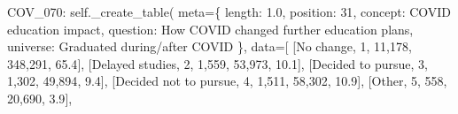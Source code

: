 \documentclass[
  11pt,
  a4paper,
]{article}
\newenvironment{Shaded}{\begin{snugshade}}{\end{snugshade}}
\newcommand{\NormalTok}[1]{\textcolor[rgb]{0.00,0.23,0.31}{#1}}
\newcommand{\OperatorTok}[1]{\textcolor[rgb]{0.37,0.37,0.37}{#1}}
\newcommand{\StringTok}[1]{\textcolor[rgb]{0.13,0.47,0.30}{#1}}
\newcommand{\VariableTok}[1]{\textcolor[rgb]{0.07,0.07,0.07}{#1}}
\begin{document}
\begin{Shaded}
\begin{Highlighting}[]
            \StringTok{\textquotesingle{}COV\_070\textquotesingle{}}\NormalTok{: }\VariableTok{self}\NormalTok{.\_create\_table(}
\NormalTok{                meta}\OperatorTok{=}\NormalTok{\{}
                \StringTok{\textquotesingle{}length\textquotesingle{}}\NormalTok{: }\StringTok{\textquotesingle{}1.0\textquotesingle{}}\NormalTok{, }\StringTok{\textquotesingle{}position\textquotesingle{}}\NormalTok{: }\StringTok{\textquotesingle{}31\textquotesingle{}}\NormalTok{,}
                \StringTok{\textquotesingle{}concept\textquotesingle{}}\NormalTok{: }\StringTok{\textquotesingle{}COVID education impact\textquotesingle{}}\NormalTok{,}
                \StringTok{\textquotesingle{}question\textquotesingle{}}\NormalTok{: }\StringTok{\textquotesingle{}How COVID changed further education plans\textquotesingle{}}\NormalTok{,}
                \StringTok{\textquotesingle{}universe\textquotesingle{}}\NormalTok{: }\StringTok{\textquotesingle{}Graduated during/after COVID\textquotesingle{}}
\NormalTok{                \},}
\NormalTok{                data}\OperatorTok{=}\NormalTok{[}
\NormalTok{                [}\StringTok{\textquotesingle{}No change\textquotesingle{}}\NormalTok{, }\StringTok{\textquotesingle{}1\textquotesingle{}}\NormalTok{, }\StringTok{\textquotesingle{}11,178\textquotesingle{}}\NormalTok{, }\StringTok{\textquotesingle{}348,291\textquotesingle{}}\NormalTok{, }\StringTok{\textquotesingle{}65.4\textquotesingle{}}\NormalTok{],}
\NormalTok{                [}\StringTok{\textquotesingle{}Delayed studies\textquotesingle{}}\NormalTok{, }\StringTok{\textquotesingle{}2\textquotesingle{}}\NormalTok{, }\StringTok{\textquotesingle{}1,559\textquotesingle{}}\NormalTok{, }\StringTok{\textquotesingle{}53,973\textquotesingle{}}\NormalTok{, }\StringTok{\textquotesingle{}10.1\textquotesingle{}}\NormalTok{],}
\NormalTok{                [}\StringTok{\textquotesingle{}Decided to pursue\textquotesingle{}}\NormalTok{, }\StringTok{\textquotesingle{}3\textquotesingle{}}\NormalTok{, }\StringTok{\textquotesingle{}1,302\textquotesingle{}}\NormalTok{, }\StringTok{\textquotesingle{}49,894\textquotesingle{}}\NormalTok{, }\StringTok{\textquotesingle{}9.4\textquotesingle{}}\NormalTok{],}
\NormalTok{                [}\StringTok{\textquotesingle{}Decided not to pursue\textquotesingle{}}\NormalTok{, }\StringTok{\textquotesingle{}4\textquotesingle{}}\NormalTok{, }\StringTok{\textquotesingle{}1,511\textquotesingle{}}\NormalTok{, }\StringTok{\textquotesingle{}58,302\textquotesingle{}}\NormalTok{, }\StringTok{\textquotesingle{}10.9\textquotesingle{}}\NormalTok{],}
\NormalTok{                [}\StringTok{\textquotesingle{}Other\textquotesingle{}}\NormalTok{, }\StringTok{\textquotesingle{}5\textquotesingle{}}\NormalTok{, }\StringTok{\textquotesingle{}558\textquotesingle{}}\NormalTok{, }\StringTok{\textquotesingle{}20,690\textquotesingle{}}\NormalTok{, }\StringTok{\textquotesingle{}3.9\textquotesingle{}}\NormalTok{],}

\end{Highlighting}
\end{Shaded}
\end{document}

